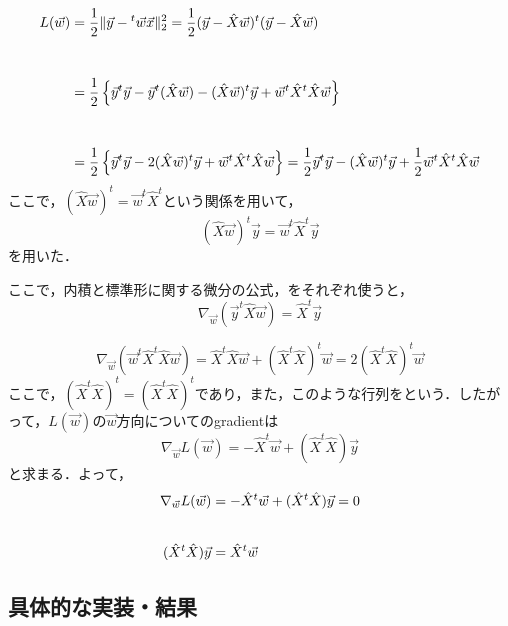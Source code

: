 \begin{align}
    L(\vec{w}) &= 
    \frac{1}{2}\|\vec{y}-{}^t\vec{w}\vec{x}\|^2_2
    =\frac{1}{2}(\vec{y}-\hat{X}\vec{w})^t(\vec{y}-\hat{X}\vec{w})\notag \\\\[10pt]
    &=\frac{1}{2}\left\{
    \vec{y}^t\vec{y} - \vec{y}^t(\hat{X}\vec{w})
    -(\hat{X}\vec{w})^t\vec{y} + \vec{w}^t\hat{X}^t\hat{X}\vec{w}\right\}\notag \\\\[10pt]
    &=\frac{1}{2}\left\{
    \vec{y}^t\vec{y} - 2(\hat{X}\vec{w})^t\vec{y} + \vec{w}^t\hat{X}^t\hat{X}\vec{w}\right\}
    =\frac{1}{2}
    \vec{y}^t\vec{y} - (\hat{X}\vec{w})^t\vec{y} + \frac{1}{2} \vec{w}^t\hat{X}^t\hat{X}\vec{w}
\end{align}
ここで，$(\hat{X}\vec{w})^t=\vec{w}^t\hat{X}^t$という関係を用いて，
\begin{equation}
    (\hat{X}\vec{w})^t\vec{y}=\vec{w}^t\hat{X}^t\vec{y}
\end{equation}
を用いた．

ここで，内積と標準形に関する微分の公式，をそれぞれ使うと，
\begin{equation}
    \nabla_{\vec{w}}(\vec{y}^t\hat{X}\vec{w})
    =\hat{X}^t\vec{y}
\end{equation}

\begin{equation}
    \nabla_{\vec{w}}(\vec{w}^t\hat{X}^t\hat{X}\vec{w})
    =\hat{X}^t\hat{X}\vec{w} + (\hat{X}^t\hat{X})^t\vec{w}
    =2(\hat{X}^t\hat{X})^t\vec{w}
\end{equation}
ここで，$(\hat{X}^t\hat{X})^t=(\hat{X}^t\hat{X})^t$であり，また，このような行列をという．したがって，$L(\vec{w})$の$\vec{w}$方向についてのgradientは
\begin{equation}
    \nabla_{\vec{w}}L(\vec{w})
    = -\hat{X}^t\vec{w} + (\hat{X}^t\hat{X})\vec{y}
\end{equation}
と求まる．よって，
\begin{align}
    \nabla_{\vec{w}}L(\vec{w})
    &= -\hat{X}^t\vec{w} + (\hat{X}^t\hat{X})\vec{y} = 0\notag \\ \\[5pt]
    (\hat{X}^t\hat{X})\vec{y} &= \hat{X}^t\vec{w}
\end{align}


\subsection{具体的な実装・結果}




